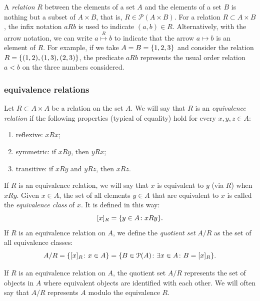 A \emph{relation}%
%
 $R$ between the elements of a set $A$ and the elements of a set $B$ is nothing but a subset of $A\times B$, that is, $R\in \mathcal P(A\times B)$. For a relation $R\subset A\times B$, the infix notation $aRb$ is used to indicate $(a,b)\in R$. Alternatively, with the arrow notation, we can write $a \stackrel R \mapsto b$ to indicate that the arrow $a\mapsto b$ is an element of $R$. For example, if we take $A=B={\left\{ 1,2,3 \right\}}$ and consider the relation $R={\left\{ (1,2),(1,3),(2,3) \right\}}$, the predicate $aRb$ represents the usual order relation $a<b$ on the three numbers considered.

\subsubsection{equivalence relations}

\begin{definition}
\label{def:equivalenza}%
\label{def:insieme_quoziente}%
Let $R\subset A\times A$ be a relation on the set $A$. We will say that $R$ is
an \emph{equivalence relation}%
%
 if the following properties (typical of equality) hold for every $x,y,z\in A$:
\begin{enumerate}
  \item reflexive: $x R x$;
  \item symmetric: if $x R y$, then $y R x$;
  \item transitive: if $x R y$ and $yRz$, then $x R z$.
\end{enumerate}
If $R$ is an equivalence relation, we will say that $x$ is equivalent to $y$
(via $R$) when $xRy$. Given $x \in A$, the set of all elements $y\in A$ that are
equivalent to $x$ is called the \emph{equivalence class}%
%
 of $x$. It is defined in this way:
\[
  [x]_R = {\left\{ y\in A \colon xRy \right\}}.  
\]
If $R$ is an equivalence relation on $A$, we define the \emph{quotient set}%
%
%
$A/R$
as the set of all equivalence classes:
\[
 A/R 
 = {\left\{ [x]_R\colon x\in A \right\}} 
 = {\left\{ B\in \mathcal P(A)\colon \exists x\in A\colon B=[x]_R \right\}}.  
\]
\end{definition}

If $R$ is an equivalence relation on $A$, the quotient set $A/R$ represents the
set of objects in $A$ where equivalent objects are identified with each other.
We will often say that $A/R$ represents $A$ modulo the equivalence $R$.

